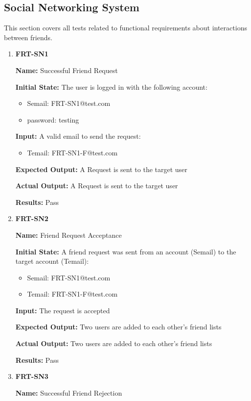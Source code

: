 \documentclass[12pt, titlepage]{article}
\begin{document}
\subsection{Social Networking System}
This section covers all tests related to functional requirements about interactions between friends.
\begin{enumerate}
\item \textbf{FRT-SN1}

\textbf{Name:} Successful Friend Request

\textbf{Initial State:} The user is logged in with the following account:
\begin{itemize}
\item Semail: FRT-SN1@test.com
\item password: testing
\end{itemize}

\textbf{Input:} A valid email to send the request:
\begin{itemize}
\item Temail: FRT-SN1-F@test.com
\end{itemize}
					
\textbf{Expected Output:} A Request is sent to the target user

\textbf{Actual Output:} A Request is sent to the target user

\textbf{Results:} Pass

\item \textbf{FRT-SN2}

\textbf{Name:} Friend Request Acceptance

\textbf{Initial State:} A friend request was sent from an account (Semail) to the target account (Temail):
\begin{itemize}
\item Semail: FRT-SN1@test.com
\item Temail: FRT-SN1-F@test.com
\end{itemize}

\textbf{Input:} The request is accepted
					
\textbf{Expected Output:} Two users are added to each other's friend lists

\textbf{Actual Output:} Two users are added to each other's friend lists

\textbf{Results:} Pass

\item \textbf{FRT-SN3}

\textbf{Name:} Successful Friend Rejection


\end{enumerate}
\end{document}
